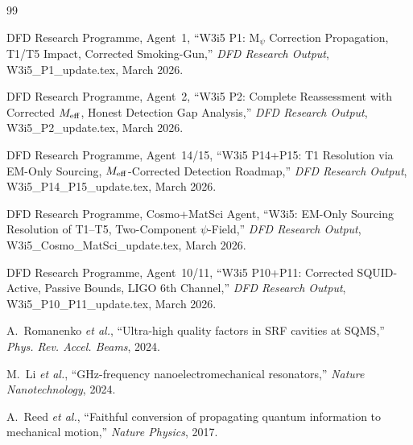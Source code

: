 \documentclass[11pt]{article}
\theoremstyle{definition}
\theoremstyle{remark}
\begin{document}
\begin{thebibliography}{99}

DFD Research Programme, Agent~1,
``W3i5 P1: M$_\psi$ Correction Propagation, T1/T5 Impact, Corrected
Smoking-Gun,''
\textit{DFD Research Output}, W3i5\_P1\_update.tex, March 2026.

DFD Research Programme, Agent~2,
``W3i5 P2: Complete Reassessment with Corrected $M_{\rm eff}$, Honest
Detection Gap Analysis,''
\textit{DFD Research Output}, W3i5\_P2\_update.tex, March 2026.

DFD Research Programme, Agent~14/15,
``W3i5 P14+P15: T1 Resolution via EM-Only Sourcing, $M_{\rm eff}$-Corrected
Detection Roadmap,''
\textit{DFD Research Output}, W3i5\_P14\_P15\_update.tex, March 2026.

DFD Research Programme, Cosmo+MatSci Agent,
``W3i5: EM-Only Sourcing Resolution of T1--T5, Two-Component $\psi$-Field,''
\textit{DFD Research Output}, W3i5\_Cosmo\_MatSci\_update.tex, March 2026.

DFD Research Programme, Agent~10/11,
``W3i5 P10+P11: Corrected SQUID-Active, Passive Bounds, LIGO 6th Channel,''
\textit{DFD Research Output}, W3i5\_P10\_P11\_update.tex, March 2026.

A.~Romanenko \textit{et al.},
``Ultra-high quality factors in SRF cavities at SQMS,''
\textit{Phys. Rev. Accel. Beams}, 2024.

M.~Li \textit{et al.},
``GHz-frequency nanoelectromechanical resonators,''
\textit{Nature Nanotechnology}, 2024.

A.~Reed \textit{et al.},
``Faithful conversion of propagating quantum information to mechanical motion,''
\textit{Nature Physics}, 2017.

\end{thebibliography}
\end{document}
